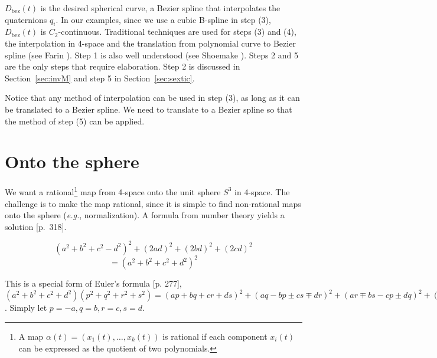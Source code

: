 $D_{\mbox{bez}}(t)$ is the desired spherical curve, a Bezier spline
that interpolates the quaternions $q_i$.
In our examples, since we use a cubic B-spline in step (3),
$D_{\mbox{bez}}(t)$ is $C_2$-continuous.
Traditional techniques are used for steps (3) and (4),
the interpolation in 4-space
and the translation from polynomial curve 
to Bezier spline (see Farin \cite{farin93}).
Step 1 is also well understood (see Shoemake \cite{shoemake85}).
Steps 2 and 5 are the only steps that require elaboration.
Step 2 is discussed in Section~\ref{sec:invM} and 
step 5 in Section~\ref{sec:sextic}.

Notice that any method of interpolation can be used in step (3),
as long as it can be translated to a Bezier spline.
We need to translate to a Bezier spline so that 
the method of step (5) can be applied.

\section{Onto the sphere}
\label{sec:onto}

We want a rational\footnote{A map $\alpha(t) = (x_1(t),\ldots,x_k(t))$
	is rational if each component $x_i(t)$ can be expressed
	as the quotient of two polynomials.}
map from 4-space onto the unit sphere $S^3$ in
4-space.
The challenge is to make the map rational,
since it is simple to find non-rational maps onto the sphere 
({\em e.g.}, normalization).
A formula from number theory yields a solution \cite{dickson52}[p.~318].

\begin{lemma}
\[
(a^2 + b^2 + c^2 - d^2)^2 + (2ad)^2 + (2bd)^2 + (2cd)^2
\]
\begin{equation}
\label{eqn:aida}
= (a^2 + b^2 + c^2 + d^2)^2
\end{equation}
\end{lemma}

\ifFull
\begin{rmk}
This is a special form of Euler's formula \cite{Dickson52}[p. 277],
$(a^2 + b^2 + c^2 + d^2)(p^2 + q^2 + r^2 + s^2) = 
  (ap+bq+cr+ds)^2 + 
  (aq-bp \pm cs \mp dr)^2 + 
  (ar \mp bs - cp \pm dq)^2 + 
  (as \pm br \mp cq - dp)^2$.
 Simply let $p=-a, q=b, r=c, s=d$.
\end{rmk}
\fi

